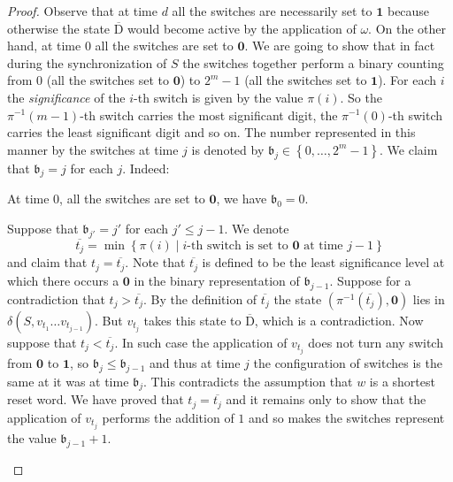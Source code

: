\documentclass{ws-ijmpc}
\begin{document}
\begin{proof}
Observe that at time $d$ all the switches are necessarily set to
$\mathbf{1}$ because otherwise the state $\overline{\mathrm{D}}$
would become active by the application of $\omega$. On the other
hand, at time $0$ all the switches are set to $\mathbf{0}$. We are
going to show that in fact during the synchronization of $S$ the
switches together perform a binary counting from $0$ (all the switches
set to $\mathbf{0}$) to $2^{m}-1$ (all the switches set to $\mathbf{1}$).
For each $i$ the\emph{ significance} of the $i$-th switch is given
by the value $\pi\!\left(i\right)$. So the $\pi^{-1}\!\left(m-1\right)$-th
switch carries the most significant digit, the $\pi^{-1}\!\left(0\right)$-th
switch carries the least significant digit and so on. The number represented
in this manner by the switches at time $j$ is denoted by $\mathfrak{b}_{j}\in\left\{ 0,\dots,2^{m}-1\right\} $.
We claim that $\mathfrak{b}_{j}=j$ for each $j$. Indeed:
\begin{itemlist}
\item At time $0$, all the switches are set to $\mathbf{0}$, we have $\mathfrak{b}_{0}=0$.
\item Suppose that $\mathfrak{b}_{j'}=j'$ for each $j'\leq j-1$. We denote
\begin{equation}
\overline{t_{j}}=\min\left\{ \pi\!\left(i\right)\mid i\mbox{-th switch is set to }\mathbf{0}\mbox{ at time }j-1\right\} \label{eq: t is min pos}
\end{equation}
and claim that $t_{j}=\overline{t_{j}}$. Note that $\overline{t_{j}}$
is defined to be the least significance level at which there occurs
a $\mathbf{0}$ in the binary representation of $\mathfrak{b}_{j-1}$.
Suppose for a contradiction that $t_{j}>\overline{t_{j}}$. By the
definition of $\overline{t_{j}}$ the state $\left(\pi^{-1}\!\left(\overline{t_{j}}\right),\mathbf{0}\right)$
lies in $\delta\!\left(S,v_{t_{1}}\dots v_{t_{j-1}}\right)$. But
$v_{t_{j}}$ takes this state to $\overline{\mathrm{D}}$, which is
a contradiction. Now suppose that $t_{j}<\overline{t_{j}}$. In such
case the application of $v_{t_{j}}$ does not turn any switch from
$\mathbf{0}$ to $\mathbf{1}$, so $\mathfrak{b}_{j}\leq\mathfrak{b}_{j-1}$
and thus at time $j$ the configuration of switches is the same at
it was at time $\mathfrak{b}_{j}$. This contradicts the assumption
that $w$ is a shortest reset word. We have proved that $t_{j}=\overline{t_{j}}$
and it remains only to show that the application of $v_{t_{j}}$ performs
the addition of $1$ and so makes the switches represent the value
$\mathfrak{b}_{j-1}+1$.


\end{itemlist}
\end{proof}
\end{document}
